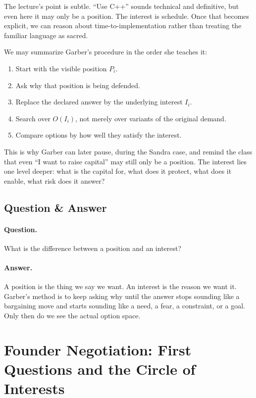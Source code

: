The lecture's point is subtle. ``Use C++'' sounds technical and definitive, but even here it may only be a position. The interest is schedule. Once that becomes explicit, we can reason about time-to-implementation rather than treating the familiar language as sacred.

We may summarize Garber's procedure in the order she teaches it:
\begin{enumerate}
\item Start with the visible position \(P_i\).
\item Ask why that position is being defended.
\item Replace the declared answer by the underlying interest \(I_i\).
\item Search over \(O(I_i)\), not merely over variants of the original demand.
\item Compare options by how well they satisfy the interest.
\end{enumerate}

This is why Garber can later pause, during the Sandra case, and remind the class that even ``I want to raise capital'' may still only be a position. The interest lies one level deeper: what is the capital for, what does it protect, what does it enable, what risk does it answer?

\subsection{Question \& Answer}

\paragraph{Question.} What is the difference between a position and an interest?

\paragraph{Answer.} A position is the thing we say we want. An interest is the reason we want it. Garber's method is to keep asking why until the answer stops sounding like a bargaining move and starts sounding like a need, a fear, a constraint, or a goal. Only then do we see the actual option space.

\section{Founder Negotiation: First Questions and the Circle of Interests}


